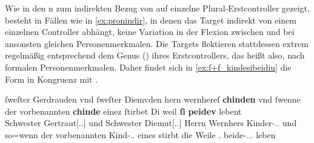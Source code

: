 Wie in den n
 zum indirekten
Bezug von  auf einzelne Plural-Erstcontroller gezeigt, besteht in
Fällen wie in \cref{ex:pronindir}, in denen das Target indirekt von einem
einzelnen Controller abhängt, keine Variation in der Flexion zwischen
 und  bei ansonsten gleichen Personenmerkmalen. Die
Targets flektieren stattdessen extrem regelmäßig entsprechend dem Genus (\Gend)
ihres Erstcontrollers, das heißt also, nach formalen Personenmerkmalen. Daher
findet sich in \cref{ex:f+f_kindesibeidiu} die Form  in Kongruenz
mit  .

\begin{exe}
\ex \label{ex:f+f_kindesibeidiu}
	\gll ſweſter Gerdrauden vnd ſweſter Diemvden hern wernhereſ
			\textbf{chinden} \textelp{} vnd ſwenne der vorbenannten
			\textbf{chinde} einez ſtirbet \textelp{} Di weil \textbf{ſi}
			\textbf{peidev} lebent \\
		Schwester Gertraut[\Dat.\Sg.\FemF] und Schwester Diemut[\Dat.\Sg.\FemF]
			Herrn Wernhers Kinder-\Dat.\Pl.\NeutF{} {} und so=wenn der
			vorbenannten Kind-\Gen.\Pl.\NeutF{} eines stirbt {} die Weile
			\Tpl\subF.\Nom{} beide-\Nom.\Pl.\NeutF.\St{} leben \\
	\begin{taggedline}{\parencites(Engelthal, Kr.~Nürnberger Land, 1298)[\pno~2960, 240.31--38]{cao4}}
	\trans {}
	\end{taggedline}

\end{exe}

